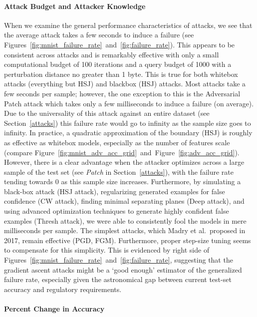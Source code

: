 \documentclass[journal]{IEEEtran}
\begin{document}
\paragraph{Attack Budget and Attacker Knowledge}
When we examine the general performance characteristics of attacks, we see that the average attack takes a few seconds to induce a failure (see Figures~\ref{fig:mnist_failure_rate}~and~\ref{fig:failure_rate}). This appears to be consistent across attacks and is remarkably effective with only a small computational budget of 100 iterations and a query budget of 1000 with a perturbation distance no greater than 1 byte. This is true for both whitebox attacks  (everything but HSJ) and blackbox (HSJ) attacks. Most attacks take a few seconds per sample; however, the one exception to this is the Adversarial Patch attack which takes only a few milliseconds to induce a failure (on average). Due to the universality of this attack against an entire dataset (see Section~\ref{attacks}) this failure rate would go to infinity as the sample size goes to infinity. In practice, a quadratic approximation of the boundary (HSJ) is roughly as effective as whitebox models, especially as the number of features scale (compare Figure~\ref{fig:mnist_adv_acc_grid}~and~Figure~\ref{fig:adv_acc_grid}). However, there is a clear advantage when the attacker optimizes across a large sample of the test set (see \textit{Patch} in Section~\ref{attacks}), with the failure rate tending towards 0 as this sample size increases. Furthermore, by simulating a black-box attack (HSJ attack), regularizing generated examples for false confidence (CW attack), finding minimal separating planes (Deep attack),  and using advanced optimization techniques to generate highly confident false examples (Thresh attack), we were able to consistently fool the models in mere milliseconds per sample. The simplest attacks, which Madry et al.~proposed in 2017, remain effective (PGD, FGM). Furthermore, proper step-size tuning seems to compensate for this simplicity. This is evidenced by right side of Figures~\ref{fig:mnist_failure_rate}~and~\ref{fig:failure_rate}, suggesting that the gradient ascent attacks might be a `good enough' estimator of the generalized failure rate, especially given the astronomical gap between current test-set accuracy and regulatory requirements.


\paragraph{Percent Change in Accuracy}
\end{document}
